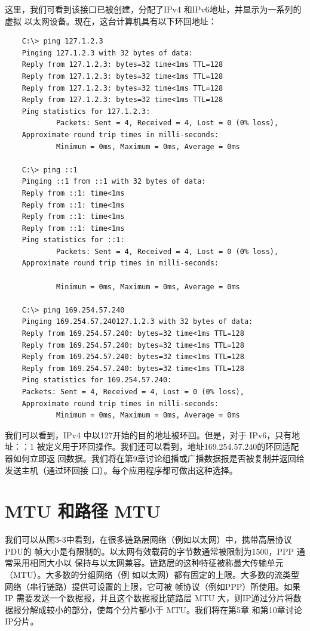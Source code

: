 这里，我们可看到该接口已被创建，分配了IPv4 和IPv6地址，并显示为一系列的虚拟
以太网设备。现在，这台计算机具有以下环回地址：
\begin{verbatim}
    C:\> ping 127.1.2.3
    Pinging 127.1.2.3 with 32 bytes of data:
    Reply from 127.1.2.3: bytes=32 time<1ms TTL=128
    Reply from 127.1.2.3: bytes=32 time<1ms TTL=128
    Reply from 127.1.2.3: bytes=32 time<1ms TTL=128
    Reply from 127.1.2.3: bytes=32 time<1ms TTL=128
    Ping statistics for 127.1.2.3:
            Packets: Sent = 4, Received = 4, Lost = 0 (0% loss),
    Approximate round trip times in milli-seconds:
            Minimum = 0ms, Maximum = 0ms, Average = 0ms

    C:\> ping ::1
    Pinging ::1 from ::1 with 32 bytes of data:
    Reply from ::1: time<1ms
    Reply from ::1: time<1ms
    Reply from ::1: time<1ms
    Reply from ::1: time<1ms
    Ping statistics for ::1:
            Packets: Sent = 4, Received = 4, Lost = 0 (0% loss),
    Approximate round trip times in milli-seconds:

            Minimum = 0ms, Maximum = 0ms, Average = 0ms

    C:\> ping 169.254.57.240
    Pinging 169.254.57.240127.1.2.3 with 32 bytes of data:
    Reply from 169.254.57.240: bytes=32 time<1ms TTL=128
    Reply from 169.254.57.240: bytes=32 time<1ms TTL=128
    Reply from 169.254.57.240: bytes=32 time<1ms TTL=128
    Reply from 169.254.57.240: bytes=32 time<1ms TTL=128
    Ping statistics for 169.254.57.240:
    Packets: Sent = 4, Received = 4, Lost = 0 (0% loss),
    Approximate round trip times in milli-seconds:
            Minimum = 0ms, Maximum = 0ms, Average = 0ms
\end{verbatim}

我们可以看到，IPv4 中以127开始的目的地址被环回。但是，对于 IPv6，只有地址：：1
被定义用于环回操作。我们还可以看到，地址169.254.57.240的环回适配器如何立即返
回数据。我们将在第9章讨论组播或广播数据报是否被复制并返回给发送主机（通过环回接
口）。每个应用程序都可做出这种选择。

\section{MTU 和路径 MTU}

我们可以从图3-3中看到，在很多链路层网络（例如以太网）中，携带高层协议 PDU的
帧大小是有限制的。以太网有效载荷的字节数通常被限制为1500，PPP 通常采用相同大小以
保持与以太网兼容。链路层的这种特征被称最大传输单元（MTU）。大多数的分组网络（例
如以太网）都有固定的上限。大多数的流类型网络（串行链路）提供可设置的上限，它可被
帧协议（例如PPP）所使用。如果IP 需要发送一个数据报，并且这个数据报比链路层 MTU
大，则IP通过分片将数据报分解成较小的部分，使每个分片都小于 MTU。我们将在第5章
和第10章讨论IP分片。

